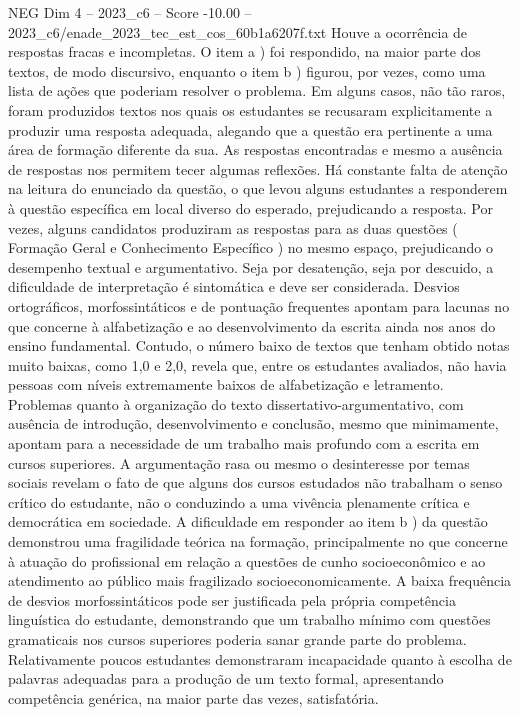 \begin{textsample}{NEG Dim 4 – 2023\_c6 – Score -10.00 – 2023\_c6/enade\_2023\_tec\_est\_cos\_60b1a6207f.txt}
Houve a ocorrência de respostas fracas e incompletas.
O item a ) foi respondido, na maior parte dos textos, de modo discursivo, enquanto o item b ) figurou, por vezes, como uma lista de ações que poderiam resolver o problema.
Em alguns casos, não tão raros, foram produzidos textos nos quais os estudantes se recusaram explicitamente a produzir uma resposta adequada, alegando que a questão era pertinente a uma área de formação diferente da sua.
As respostas encontradas e mesmo a ausência de respostas nos permitem tecer algumas reflexões.
Há constante falta de atenção na leitura do enunciado da questão, o que levou alguns estudantes a responderem à questão específica em local diverso do esperado, prejudicando a resposta.
Por vezes, alguns candidatos produziram as respostas para as duas questões ( Formação Geral e Conhecimento Específico ) no mesmo espaço, prejudicando o desempenho textual e argumentativo.
Seja por desatenção, seja por descuido, a dificuldade de interpretação é sintomática e deve ser considerada.
Desvios ortográficos, morfossintáticos e de pontuação frequentes apontam para lacunas no que concerne à alfabetização e ao desenvolvimento da escrita ainda nos anos do ensino fundamental.
Contudo, o número baixo de textos que tenham obtido notas muito baixas, como 1,0 e 2,0, revela que, entre os estudantes avaliados, não havia pessoas com níveis extremamente baixos de alfabetização e letramento.
Problemas quanto à organização do texto dissertativo-argumentativo, com ausência de introdução, desenvolvimento e conclusão, mesmo que minimamente, apontam para a necessidade de um trabalho mais profundo com a escrita em cursos superiores.
A argumentação rasa ou mesmo o desinteresse por temas sociais revelam o fato de que alguns dos cursos estudados não trabalham o senso crítico do estudante, não o conduzindo a uma vivência plenamente crítica e democrática em sociedade.
A dificuldade em responder ao item b ) da questão demonstrou uma fragilidade teórica na formação, principalmente no que concerne à atuação do profissional em relação a questões de cunho socioeconômico e ao atendimento ao público mais fragilizado socioeconomicamente.
A baixa frequência de desvios morfossintáticos pode ser justificada pela própria competência linguística do estudante, demonstrando que um trabalho mínimo com questões gramaticais nos cursos superiores poderia sanar grande parte do problema.
Relativamente poucos estudantes demonstraram incapacidade quanto à escolha de palavras adequadas para a produção de um texto formal, apresentando competência genérica, na maior parte das vezes, satisfatória.

\end{textsample}
